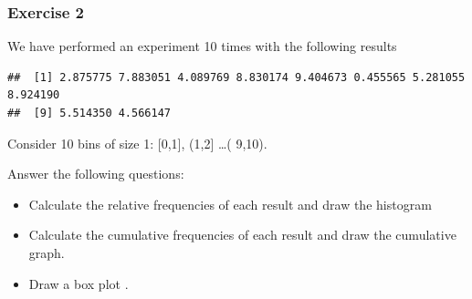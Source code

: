 \documentclass[
]{book}
\begin{document}
\hypertarget{exercise-2}{%
\subsubsection{Exercise 2}\label{exercise-2}}

We have performed an experiment 10 times with the following results

\begin{verbatim}
##  [1] 2.875775 7.883051 4.089769 8.830174 9.404673 0.455565 5.281055 8.924190
##  [9] 5.514350 4.566147
\end{verbatim}

Consider 10 bins of size 1: {[}0,1{]}, (1,2{]} \ldots( 9,10).

Answer the following questions:

\begin{itemize}
\item
  Calculate the relative frequencies of each result and draw the histogram
\item
  Calculate the cumulative frequencies of each result and draw the cumulative graph.
\item
  Draw a box plot .
\end{itemize}

  
\end{document}
